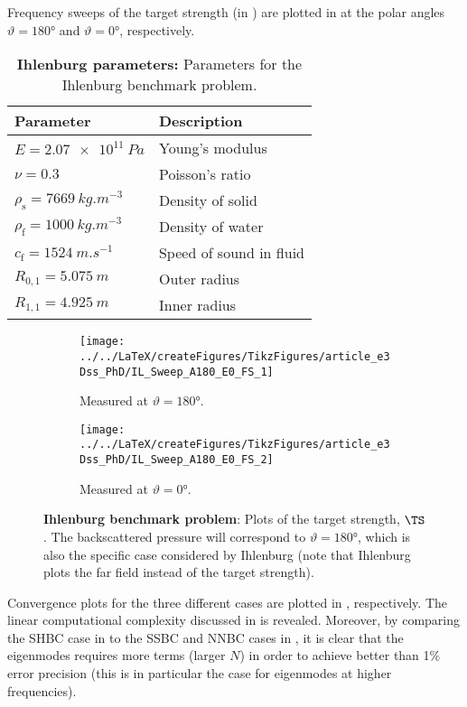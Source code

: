 Frequency sweeps of the target strength (in ) are plotted in  at the polar angles $\vartheta=\ang{180}$ and $\vartheta=\ang{0}$, respectively.
\begin{table}
	\centering
	\caption{\textbf{Ihlenburg parameters:} Parameters for the Ihlenburg benchmark problem.}
	\label{Tab1:IhlenburgParameters}
	\begin{tabular}{l l}
		\toprule
		Parameter & Description\\
		\midrule
		$E = \SI{2.07e11}{Pa}$ & Young's modulus\\
		$\nu = 0.3$ & Poisson's ratio\\
		$\rho_{\mathrm{s}} = \SI{7669}{kg.m^{-3}}$ & Density of solid\\
		$\rho_{\mathrm{f}} = \SI{1000}{kg.m^{-3}}$ & Density of water\\
		$c_{\mathrm{f}} = \SI{1524}{m.s^{-1}}$ & Speed of sound in fluid\\
		$R_{0,1}=\SI{5.075}{m}$ & Outer radius\\
		$R_{1,1}=\SI{4.925}{m}$ & Inner radius\\
		\bottomrule
	\end{tabular}
\end{table}

\begin{figure}
	\centering
	\begin{subfigure}[t]{\textwidth}
		\centering
		\texttt{[image: ../../LaTeX/createFigures/TikzFigures/article\_e3Dss\_PhD/IL\_Sweep\_A180\_E0\_FS\_1]}
		\caption{Measured at $\vartheta = \ang{180}$.}
		\label{Fig1:Ihlenburg1}
	\end{subfigure}
	\par\bigskip
	\begin{subfigure}[t]{\textwidth}
		\centering
		\texttt{[image: ../../LaTeX/createFigures/TikzFigures/article\_e3Dss\_PhD/IL\_Sweep\_A180\_E0\_FS\_2]}
		\caption{Measured at $\vartheta = \ang{0}$.}
		\label{Fig1:Ihlenburg2}
	\end{subfigure}
	\caption{\textbf{Ihlenburg benchmark problem}: Plots of the target strength, $\TS$. The backscattered pressure will correspond to $\vartheta=\ang{180}$, which is also the specific case considered by Ihlenburg \cite[p. 192]{Ihlenburg1998fea} (note that Ihlenburg plots the far field instead of the target strength).}
\end{figure}
Convergence plots for the three different cases are plotted in , respectively. The linear computational complexity discussed in  is revealed. Moreover, by comparing the SHBC case in  to the SSBC and NNBC cases in , it is clear that the eigenmodes requires more terms (larger $N$) in order to achieve better than 1\% error precision (this is in particular the case for eigenmodes at higher frequencies). 

